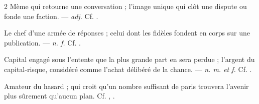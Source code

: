 \begin{multicols}{2}
 Mème qui retourne une conversation ; l'image unique qui clôt une dispute ou fonde une faction. —  \textit{adj.} Cf. .

 Le chef d'une armée de réponses ; celui dont les fidèles fondent en corps sur une publication. —  \textit{n. f.} Cf. .

 Capital engagé sous l'entente que la plus grande part en sera perdue ; l'argent du capital-risque, considéré comme l'achat délibéré de la chance. —  \textit{n. m. et f.} Cf. .

 Amateur du hasard ; qui croit qu'un nombre suffisant de paris trouvera l'avenir plus sûrement qu'aucun plan. Cf. , .

\end{multicols}

